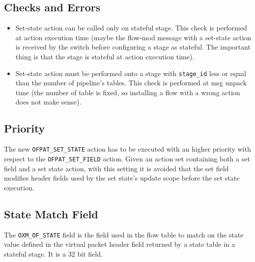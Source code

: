 \subsection{Checks and Errors}

\begin{itemize}
\item Set-state action can be called only on stateful stage. This check is performed at action execution time (maybe the flow-mod message with a set-state action is received by the switch before configuring a stage as stateful. The important thing is that the stage is stateful at action execution time).

\item Set-state action must be performed onto a stage with \texttt{stage\_id} less or equal than the number of pipeline’s tables. This check is performed at msg unpack time (the number of table is fixed, so installing a flow with a wrong action does not make sense). 
\end{itemize}

\subsection{Priority}

The new \texttt{OFPAT\_SET\_STATE} action has to be executed with an higher priority with respect to the \texttt{OFPAT\_SET\_FIELD} action. Given an action set containing both a set field and a set state action, with this setting it is avoided that the set field modifies header fields used by the set state's update scope before the set state execution.


\subsection{State Match Field}
\label{sec:match_state}

The \texttt{OXM\_OF\_STATE} field is the field used in the flow table to match on the state value defined in the virtual packet header field returned by a state table in a stateful stage. It is a 32 bit field.


